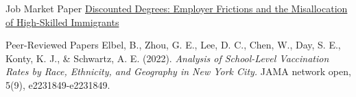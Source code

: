 \documentclass{resume} %
\begin{document}
\begin{rSection}{Job Market Paper}
\href{https://willycecon.com/JMP.pdf}{Discounted Degrees: Employer Frictions and the Misallocation of High-Skilled Immigrants}
\end{rSection}


\begin{rSection}{Peer-Reviewed Papers}
Elbel, B., Zhou, G. E., Lee, D. C., Chen, W., Day, S. E., Konty, K. J., \& Schwartz, A. E. (2022). \textit{Analysis of School-Level Vaccination Rates by Race, Ethnicity, and Geography in New York City.} JAMA network open, 5(9), e2231849-e2231849.
\end{rSection}
\end{document}

